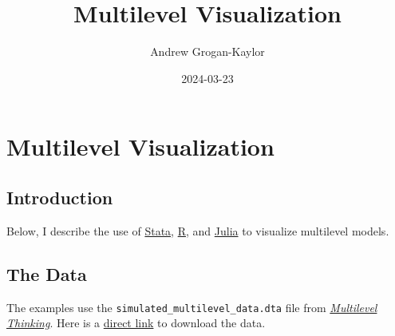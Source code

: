 \documentclass[
  letterpaper,
  DIV=11,
  numbers=noendperiod]{scrreprt}
\title{Multilevel Visualization}
\author{Andrew Grogan-Kaylor}
\date{2024-03-23}
\renewcommand*\contentsname{Table of contents}
\newcommand\contentsname{Table of contents}
\begin{document}
\maketitle

\renewcommand*\contentsname{Table of contents}
{
\hypersetup{linkcolor=}
\setcounter{tocdepth}{2}
\tableofcontents
}
\listoffigures
\listoftables
{}

\chapter{Multilevel Visualization}\label{multilevel-visualization}

\section{Introduction}\label{introduction}

Below, I describe the use of \href{https://www.stata.com/}{Stata},
\href{https://www.r-project.org/}{R}, and
\href{https://www.julialang.org/}{Julia} to visualize multilevel models.

\section{The Data}\label{sec-data}

The examples use the \texttt{simulated\_multilevel\_data.dta} file from
\href{https://agrogan1.github.io/multilevel-thinking/simulated-multi-country-data.html}{\emph{Multilevel
Thinking}}. Here is a
\href{https://github.com/agrogan1/multilevel-multilingual/raw/main/simulated_multilevel_data.dta}{direct
link} to download the data.
\end{document}
